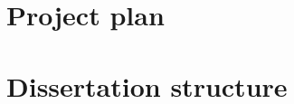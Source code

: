 \documentclass[proposal]{softeng}
\begin{document}
\section{Project plan}


\section{Dissertation structure}


\nocite{*}


\end{document}
